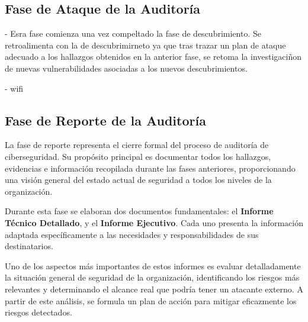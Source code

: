 \documentclass[a4paper, 11pt]{article}
\begin{document}
\par\vspace{0.5cm}





\clearpage




\subsection{Fase de Ataque de la Auditoría}
\par\vspace{0.5cm}



-   Esra fase comienza una vez compeltado la fase de descubrimiento. Se retroalimenta con la de descubrimirneto ya que tras trazar un plan de ataque adecuado a los hallazgos obtenidos en la anterior fase, se retoma la investigaciñon de nuevas vulnerabilidades asociadas a los nuevos descubrimientos.


- wifi



\clearpage




\subsection{Fase de Reporte de la Auditoría}

La fase de reporte representa el cierre formal del proceso de auditoría de ciberseguridad. 
Su propósito principal es documentar todos los hallazgos, evidencias e información recopilada durante las fases anteriores,
 proporcionando una visión general del estado actual de seguridad a todos los niveles de la organización. 

\par\vspace{0.5cm}

Durante esta fase se elaboran dos documentos fundamentales: el \textbf{Informe Técnico Detallado}, y el \textbf{Informe Ejecutivo}. Cada uno presenta la información adaptada específicamente a las necesidades y responsabilidades de sus destinatarios.
\par\vspace{0.5cm}

Uno de los aspectos más importantes de estos informes es evaluar detalladamente la situación general de seguridad de la organización, identificando los riesgos más relevantes y determinando el alcance real que podría tener un atacante externo. A partir de este análisis, se formula un plan de acción para mitigar eficazmente los riesgos detectados.
\par\vspace{0.5cm}
\end{document}
